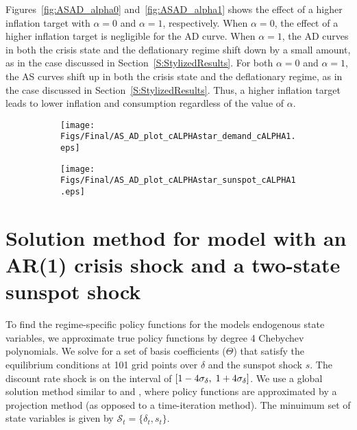 \documentclass[11pt]{article}
\begin{document}
\begin{singlespace}
		Figures~\ref{fig:ASAD_alpha0} and~\ref{fig:ASAD_alpha1} shows the effect of a higher inflation target with $\alpha=0$ and $\alpha=1$, respectively. When $\alpha=0$, the effect of a higher inflation target is negligible for the AD curve. When $\alpha=1$, the AD curves in both the crisis state and the deflationary regime shift down by a small amount, as in the case discussed in Section~\ref{S:StylizedResults}. For both $\alpha=0$ and $\alpha=1$, the AS curves shift up in both the crisis state and the deflationary regime, as in the case discussed in Section~\ref{S:StylizedResults}. Thus, a higher inflation target leads to lower inflation and consumption regardless of the value of $\alpha$.
		
		\begin{figure}[h]
			\caption{AD and AS Curves: $\alpha = 1$} \label{fig:ASAD_alpha1}
	        \vspace{-1em}
			\begin{center}
				\begin{subfigure}[b]{0.4\textwidth}
					\centering		        	\texttt{[image: Figs/Final/AS\_AD\_plot\_cALPHAstar\_demand\_cALPHA1.eps]}
				\end{subfigure}
				\hspace{0.5cm}     
				\begin{subfigure}[b]{0.4\textwidth}
					\centering					\texttt{[image: Figs/Final/AS\_AD\_plot\_cALPHAstar\_sunspot\_cALPHA1.eps]}
				\end{subfigure}
			\end{center}
		\end{figure}

		\section{Solution method for model with an AR(1) crisis shock and a two-state sunspot shock}
		\label{A:SolutionMethod}

        To find the regime-specific policy functions for the models endogenous state variables, we approximate true policy functions by degree 4 Chebychev polynomials. We solve for a set of basis coefficients ($\Theta$) that satisfy the equilibrium conditions at  101 grid points over $\delta$ and the sunspot shock $s$. The discount rate shock is on the interval of $[1-4\sigma_{\delta}, \hspace{0.1 cm} 1+4\sigma_{\delta}]$. We use a global solution method similar to \citet{Judd1992} and \citet{AruobaCubaBordaSchorfheide2018}, where policy functions are approximated by a projection method (as opposed to a time-iteration method). The minuimum set of state variables is given by $\mathcal{S}_t = \{\delta_t, s_t\}$.
    

\end{singlespace}
\end{document}
